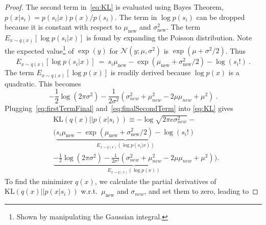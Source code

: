 \begin{proof}
The second term in~\eqref{eq:KL} is evaluated using
Bayes Theorem,
$p(x|s_i)=p(s_i|x)p(x)/p(s_i)$.
The term in $\log p(s_i)$ can be dropped because it is constant
with respect to $\mu_{\text{new}}$ and $\sigma_{\text{new}}^2$.
The term $E_{x\sim q(x)} [\log p(s_i|x)]$ is found by expanding the
Poisson distribution. 
Note the expected value\footnote{Shown by manipulating the Gaussian integral.}
 of $\exp(y)$ for $\mathcal{N}(y;\mu,\sigma^2)$
is  $\exp(\mu+\sigma^2/2)$.
Thus 
\begin{equation}\label{eq:firstTermFinal}
  E_{x\sim q(x)} [\log p(s_i|x)] ~=~ s_i \mu_{\text{new}} - \exp(\mu_{\text{new}} + \sigma_{\text{new}}^2/2) - \log(s_i!)~.
\end{equation}
\noindent
The term $E_{x\sim q(x)}[\log p(x)]$ is readily derived because
$\log p(x)$ is a quadratic.
This becomes 
\begin{equation}\label{eq:finalSecondTerm}
     -\frac{1}{2}\log(2\pi\sigma^2) -
         \frac{1}{2\sigma^2}\left(\sigma_{new}^2 + \mu_{new}^2-2\mu\mu_{new} + \mu^2 \right)~.
\end{equation}
Plugging~\eqref{eq:firstTermFinal} and~\eqref{eq:finalSecondTerm} into
\eqref{eq:KL} gives
\begin{align*}
    &\text{KL}\left(q(x)|| p(x|s_i)\right) \equiv -\log\sqrt{2\pi e \sigma_{new}^2} - \nonumber \\
    &\bigg( \underbrace{s_i \mu_{\text{new}} - \exp(\mu_{\text{new}} + \sigma_{\text{new}}^2/2) - \log(s_i!)}_{E_{x\sim q(x)} (\log p(s_i|x))} \nonumber \\
    & \underbrace{-\frac{1}{2}\log(2\pi\sigma^2) - \frac{1}{2\sigma^2}\left(\sigma_{new}^2 + \mu_{new}^2-2\mu\mu_{new} + \mu^2 \right)}_{E_{x\sim q(x)}(\log p(x))} \bigg).
\end{align*}
To find the minimizer $q(x)$, we calculate the partial derivatives of
$\text{KL}\left(q(x)|| p(x|s_i)\right)$ w.r.t.\
$\mu_{\text{new}}$ and $\sigma_{new}$, and set them to zero, leading to%

\end{proof}
